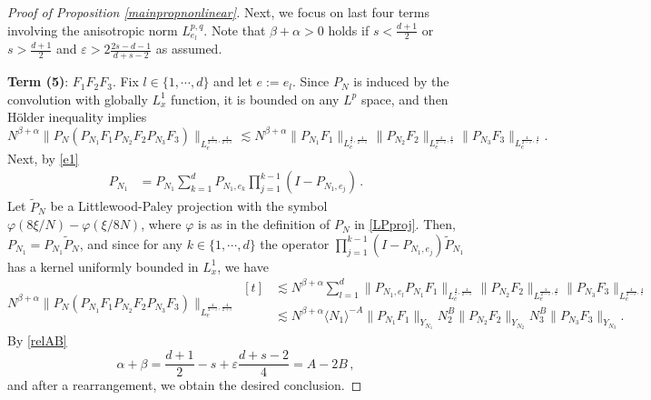 \documentclass[aihp]{imsart}
\numberwithin{equation}{section}
\theoremstyle{plain}
\theoremstyle{remark}
\begin{document}
\begin{proof}[Proof of Proposition \ref{mainpropnonlinear}]
Next, we focus on last four terms involving the anisotropic norm $L_{e_l}^{p,q}$. 
Note that $\beta +\alpha>0$ holds if $s<\frac{d+1}{2}$ or $s>\frac{d+1}{2}$ and $\varepsilon> 2\frac{2s-d-1}{d+s-2}$ as assumed.


\textbf{Term (5)}: $F_1 F_2 F_3$. 
Fix $l \in \{1, \cdots, d\}$ and let $e := e_l$.
Since $P_N$ is induced by the convolution with globally $L^1_x$ function, it is bounded on any $L^p$ space, and  then H\"older inequality implies
\begin{equation*}
N^{\beta +\alpha} \|P_N (P_{N_1} F_1 P_{N_2} F_2 P_{N_3} F_3) \|_{L^{\frac{4}{4-\varepsilon} ,\frac{4}{2+\varepsilon}}_e}
 \lesssim N^{\beta +\alpha} \|P_{N_1} F_1\|_{L_e^{\frac{4}{\varepsilon} ,\frac{4}{2-\varepsilon}}} \|P_{N_2} F_2\|_{L_e^{\frac{4}{2-\varepsilon} ,\frac{4}{\varepsilon}}} \|P_{N_3} F_3\|_{L_e^{\frac{4}{2-\varepsilon} ,\frac{4}{\varepsilon}}}.
\end{equation*}
Next, by \eqref{e1}
\begin{align*}
P_{N_1}&= P_{N_1} \sum_{k = 1}^d P_{N_1 ,e_k} \prod_{j = 1}^{k - 1} (I - P_{N_1, e_j})
\,.
\end{align*}
Let $\tilde{P}_N$ be a Littlewood-Paley projection with the symbol  $\varphi(8\xi/N) - \varphi(\xi/8N)$, where $\varphi$ is as in the definition of $P_N$ in \eqref{LPproj}. 
Then, $P_{N_1} = P_{N_1}\tilde{P}_N$,
and since for any $k \in \{1, \cdots, d\}$ the operator $\prod_{j = 1}^{k - 1} (I - P_{N_1, e_j}) \tilde{P}_{N_1}$ has a kernel uniformly bounded in $L_x^1$, we have
\begin{equation*}
N^{\beta +\alpha} \|P_N (P_{N_1} F_1 P_{N_2} F_2 P_{N_3} F_3) \|_{L^{\frac{4}{4-\varepsilon} ,\frac{4}{2+\varepsilon}}_e}
\begin{aligned}[t]
& \lesssim N^{\beta +\alpha}\sum_{l=1}^d \|P_{N_1,e_l} P_{N_1} F_1\|_{L_e^{\frac{4}{\varepsilon} ,\frac{4}{2-\varepsilon}}} \|P_{N_2} F_2\|_{L_e^{\frac{4}{2-\varepsilon} ,\frac{4}{\varepsilon}}} \|P_{N_3} F_3\|_{L_e^{\frac{4}{2-\varepsilon} ,\frac{4}{\varepsilon}}}\\
&\lesssim N^{\beta +\alpha} \langle N_1\rangle^{-A}  \| P_{N_1} F_1\|_{Y_{N_1}} N_2^B \|P_{N_2} F_2\|_{Y_{N_2}} N_3^B \|P_{N_3} F_3\|_{Y_{N_3}}.
\end{aligned}
\end{equation*}
By \eqref{relAB}
$$
\alpha+\beta= \frac{d+1}{2} -s +\varepsilon \dfrac{d+s-2}{4} = A - 2B \,,
$$
and after a rearrangement, 
we obtain the desired conclusion. 



\end{proof}
\end{document}
